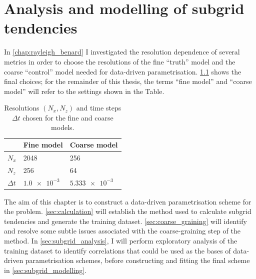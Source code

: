 \documentclass[../main.tex]{subfiles}
\begin{document}
\ifSubfilesClassLoaded{
    \frontmatter
    \tableofcontents
    \mainmatter
}{}

\chapter{Analysis and modelling of subgrid tendencies}
\label{chap:tendencies}
\setlength{\epigraphwidth}{.45\textwidth}

In \cref{chap:rayleigh_benard} I investigated the resolution dependence
of several metrics in order to choose the resolutions of the fine ``truth''
model and the coarse ``control'' model needed for data-driven parametrisation.
\cref{tab:final_resolutions} shows the final choices; for the remainder
of this thesis, the terms ``fine model'' and ``coarse model'' will refer
to the settings shown in the Table.

\begin{table}[ht]
\centering
\begin{tabular}{l l l}
    \toprule
    & \textbf{Fine model} & \textbf{Coarse model} \\
    \midrule
    $N_x$ & 2048 & 256 \\
    $N_z$ & 256 & 64 \\
    $\Delta t$ & $\SI{1.0e-3}{}$ & $\SI{5.333e-3}{}$ \\
    \bottomrule
\end{tabular}
\caption{
    Resolutions $(N_x, N_z)$ and time steps $\Delta t$ chosen for the fine and
    coarse models.
}
\label{tab:final_resolutions}
\end{table}

The aim of this chapter is to construct a data-driven parametrisation scheme
for the \rb{} problem. \cref{sec:calculation} will establish the method used to
calculate subgrid tendencies and generate the training dataset.
\cref{sec:coarse_graining} will identify and resolve some subtle issues
associated with the coarse-graining step of the method.
In \cref{sec:subgrid_analysis}, I will perform exploratory analysis of the
training dataset to identify correlations that could be used as the bases of
data-driven parametrisation schemes, before constructing and fitting the
final scheme in \cref{sec:subgrid_modelling}.
\end{document}

